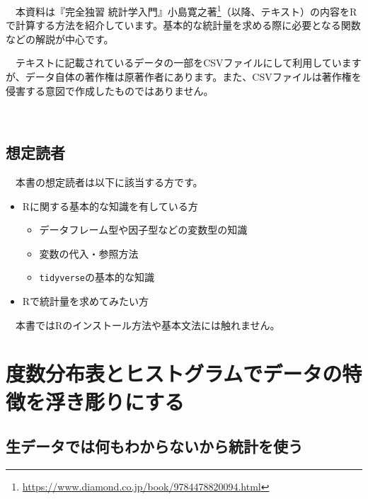 \documentclass[
  12pt,
]{book}
\DeclareRobustCommand{\href}[2]{#2\footnote{\url{#1}}}
\providecommand{\tightlist}{%
  \setlength{\itemsep}{0pt}\setlength{\parskip}{0pt}}
\begin{document}
　本資料は\href{https://www.diamond.co.jp/book/9784478820094.html}{『完全独習 統計学入門』小島寛之著}（以降、テキスト）の内容をRで計算する方法を紹介しています。基本的な統計量を求める際に必要となる関数などの解説が中心です。 　

　テキストに記載されているデータの一部をCSVファイルにして利用していますが、データ自体の著作権は原著作者にあります。また、CSVファイルは著作権を侵害する意図で作成したものではありません。

　

\hypertarget{ux60f3ux5b9aux8aadux8005}{%
\section*{想定読者}\label{ux60f3ux5b9aux8aadux8005}}

　本書の想定読者は以下に該当する方です。

\begin{itemize}
\tightlist
\item
  Rに関する基本的な知識を有している方

  \begin{itemize}
  \tightlist
  \item
    データフレーム型や因子型などの変数型の知識
  \item
    変数の代入・参照方法
  \item
    \texttt{tidyverse}の基本的な知識
  \end{itemize}
\item
  Rで統計量を求めてみたい方
\end{itemize}

　本書ではRのインストール方法や基本文法には触れません。

\hypertarget{ux5ea6ux6570ux5206ux5e03ux8868ux3068ux30d2ux30b9ux30c8ux30b0ux30e9ux30e0ux3067ux30c7ux30fcux30bfux306eux7279ux5fb4ux3092ux6d6eux304dux5f6bux308aux306bux3059ux308b}{%
\chapter{度数分布表とヒストグラムでデータの特徴を浮き彫りにする}\label{ux5ea6ux6570ux5206ux5e03ux8868ux3068ux30d2ux30b9ux30c8ux30b0ux30e9ux30e0ux3067ux30c7ux30fcux30bfux306eux7279ux5fb4ux3092ux6d6eux304dux5f6bux308aux306bux3059ux308b}}

\hypertarget{ux751fux30c7ux30fcux30bfux3067ux306fux4f55ux3082ux308fux304bux3089ux306aux3044ux304bux3089ux7d71ux8a08ux3092ux4f7fux3046}{%
\section{生データでは何もわからないから統計を使う}\label{ux751fux30c7ux30fcux30bfux3067ux306fux4f55ux3082ux308fux304bux3089ux306aux3044ux304bux3089ux7d71ux8a08ux3092ux4f7fux3046}}
\end{document}
